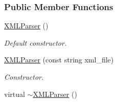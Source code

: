 \subsubsection*{Public Member Functions}
\begin{DoxyCompactItemize}
\item 
\hypertarget{class_x_m_l_parser_a60004d4b50ef242bbd191a494fd750f1}{
\hyperlink{class_x_m_l_parser_a60004d4b50ef242bbd191a494fd750f1}{XMLParser} ()}
\label{class_x_m_l_parser_a60004d4b50ef242bbd191a494fd750f1}

\begin{DoxyCompactList}\small\item\em Default constructor. \item\end{DoxyCompactList}\item 
\hyperlink{class_x_m_l_parser_a43f8cd70bcde521bb6a34e7276492b43}{XMLParser} (const string xml\_\-file)
\begin{DoxyCompactList}\small\item\em Constructor. \item\end{DoxyCompactList}\item 
\hypertarget{class_x_m_l_parser_adb8b07a5a1c20ac30beac7f149a59871}{
virtual \hyperlink{class_x_m_l_parser_adb8b07a5a1c20ac30beac7f149a59871}{$\sim$XMLParser} ()}
\label{class_x_m_l_parser_adb8b07a5a1c20ac30beac7f149a59871}


\end{DoxyCompactItemize}
